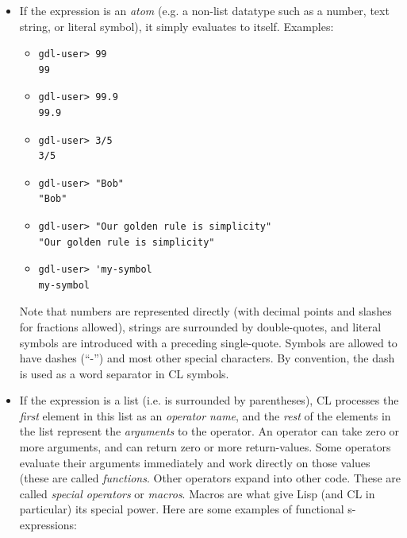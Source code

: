 \documentclass [11pt]{book}
\begin{document}
\begin{itemize}

\item If the expression is an \emph{atom} (e.g. a non-list datatype such as a number, text
string, or literal symbol), it simply evaluates to itself. Examples: 

\begin{itemize}

\item 

\begin{verbatim}gdl-user> 99
99
\end{verbatim}

\item 

\begin{verbatim}gdl-user> 99.9
99.9
\end{verbatim}

\item 

\begin{verbatim}gdl-user> 3/5
3/5
\end{verbatim}

\item 

\begin{verbatim}gdl-user> "Bob"
"Bob"
\end{verbatim}

\item 

\begin{verbatim}gdl-user> "Our golden rule is simplicity"
"Our golden rule is simplicity"
\end{verbatim}

\item 

\begin{verbatim}gdl-user> 'my-symbol
my-symbol
\end{verbatim}

\end{itemize}

Note that numbers are represented directly (with decimal
points and slashes for fractions allowed), strings are surrounded by
double-quotes, and literal symbols are introduced with a preceding
single-quote. Symbols are allowed to have dashes (``-'') and most
other special characters. By convention, the dash is used as a word
separator in CL symbols.

\item If the expression is a list (i.e. is surrounded by
parentheses), CL processes the \emph{first} element in this list as an \emph{operator name}, and the \emph{rest} of the elements in the list represent the \emph{arguments} to the operator. An operator can take zero or more
arguments, and can return zero or more return-values. Some operators
evaluate their arguments immediately and work directly on those
values (these are called \emph{functions}. Other operators expand into other code. These are called \emph{special operators} or \emph{macros}. Macros are what give Lisp (and CL in particular) its
special power. Here are some examples of functional s-expressions: 


\end{itemize}
\end{document}
